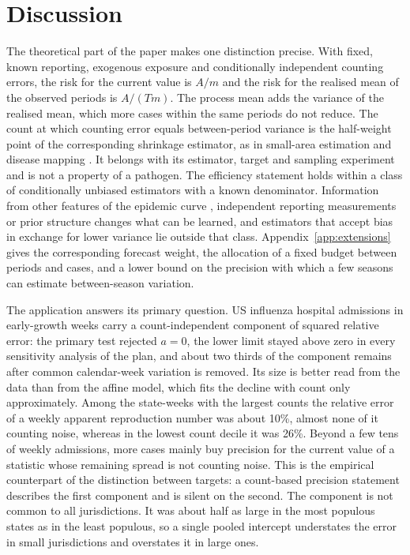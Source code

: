 \section{Discussion}
\label{sec:discussion}

The theoretical part of the paper makes one distinction precise. With fixed, known reporting, exogenous exposure and conditionally independent counting errors, the risk for the current value is $A/m$ and the risk for the realised mean of the observed periods is $A/(Tm)$. The process mean adds the variance of the realised mean, which more cases within the same periods do not reduce. The count at which counting error equals between-period variance is the half-weight point of the corresponding shrinkage estimator, as in small-area estimation and disease mapping \citep{fay1979estimates, clayton1987empirical}. It belongs with its estimator, target and sampling experiment and is not a property of a pathogen. The efficiency statement holds within a class of conditionally unbiased estimators with a known denominator. Information from other features of the epidemic curve \citep{parag2022quantifying, parag2022fundamental}, independent reporting measurements or prior structure changes what can be learned, and estimators that accept bias in exchange for lower variance lie outside that class. Appendix~\ref{app:extensions} gives the corresponding forecast weight, the allocation of a fixed budget between periods and cases, and a lower bound on the precision with which a few seasons can estimate between-season variation.

The application answers its primary question. US influenza hospital admissions in early-growth weeks carry a count-independent component of squared relative error: the primary test rejected $a=0$, the lower limit stayed above zero in every sensitivity analysis of the plan, and about two thirds of the component remains after common calendar-week variation is removed. Its size is better read from the data than from the affine model, which fits the decline with count only approximately. Among the state-weeks with the largest counts the relative error of a weekly apparent reproduction number was about 10\%, almost none of it counting noise, whereas in the lowest count decile it was 26\%. Beyond a few tens of weekly admissions, more cases mainly buy precision for the current value of a statistic whose remaining spread is not counting noise. This is the empirical counterpart of the distinction between targets: a count-based precision statement describes the first component and is silent on the second. The component is not common to all jurisdictions. It was about half as large in the most populous states as in the least populous, so a single pooled intercept understates the error in small jurisdictions and overstates it in large ones.

